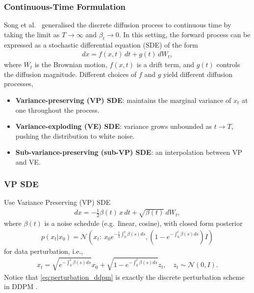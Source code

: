\documentclass[a4paper,12pt]{article}
\begin{document}
\subsubsection{Continuous-Time Formulation}
Song et al.~\cite{song2020score} generalised the discrete diffusion process to continuous time by taking the limit as \(T \to \infty\) and \(\beta_t \to 0\). In this setting, the forward process can be expressed as a stochastic differential equation (SDE) of the form
\begin{align}\label{eq:forward_sde}
    dx = f(x,t)\,dt + g(t)\,dW_t,
\end{align}
where \(W_t\) is the Brownian motion, \(f(x,t)\) is a drift term, and \(g(t)\) controls the diffusion magnitude. Different choices of \(f\) and \(g\) yield different diffusion processes,
\begin{itemize}
    \item \textbf{Variance-preserving (VP) SDE}: maintains the marginal variance of $x_t$ at one throughout the process.  
    \item \textbf{Variance-exploding (VE) SDE}: variance grows unbounded as $t \to T$, pushing the distribution to white noise.  
    \item \textbf{Sub-variance-preserving (sub-VP) SDE}: an interpolation between VP and VE.  
\end{itemize}
\subsubsection{VP SDE}
Use Variance Preserving (VP) SDE \cite{song2020score}
\begin{align}\label{eq:VPSDE}
    dx = -\frac{1}{2}\beta(t)\,x\,dt + \sqrt{\beta(t)}\,dW_t,
\end{align}
where $\beta(t)$ is a noise schedule (e.g.~linear, cosine), with closed form posterior
\begin{align*}
    p\left(x_t|x_0\right)=\mathcal{N}\left(x_t:\:x_0e^{-\frac{1}{2}\int_0^t\beta(s)ds},\left(1-e^{-\int_0^t\beta(s)ds}\right)I\right)
\end{align*}
for data perturbation, i.e.,
\begin{align}\label{eq:perturbation_ddpm}
    x_t=\sqrt{e^{-\int_0^t\beta(s)ds}}x_0+\sqrt{1-e^{-\int_0^t\beta(s)ds}}z_t,\quad z_t\sim\mathcal{N}\left(0, I\right).
\end{align}
Notice that \cref{eq:perturbation_ddpm} is exactly the discrete perturbation scheme in DDPM \cite{hoDenoisingDiffusionProbabilistic2020}.
\end{document}
